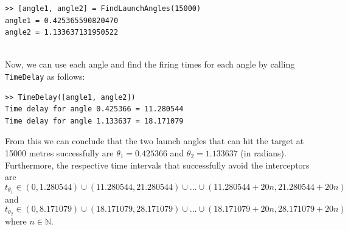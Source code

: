 \documentclass[11pt]{report}
\begin{document}
\begin{lstlisting}[title={Firing Angles (in radians) to hit target at 15000m.}]
>> [angle1, angle2] = FindLaunchAngles(15000)
angle1 = 0.425365590820470
angle2 = 1.133637131950522
\end{lstlisting}

\ \\
Now, we can use each angle and find the firing times for each angle by calling \texttt{TimeDelay} as follows:

\begin{lstlisting}[title={Time delays for both firing angles.}]
>> TimeDelay([angle1, angle2])
Time delay for angle 0.425366 = 11.280544
Time delay for angle 1.133637 = 18.171079
\end{lstlisting}

From this we can conclude that the two launch angles that can hit the target at 15000 metres successfully are $\theta_1 = 0.425366$ and $\theta_2 = 1.133637$ (in radians). Furthermore, the respective time intervals that successfully avoid the interceptors are
 $$ t_{\theta_1} \in (0, 1.280544) \cup (11.280544, 21.280544) \cup \ldots \cup (11.280544 + 20n, 21.280544 + 20n)$$ 
 and
 $$ t_{\theta_2} \in (0, 8.171079) \cup (18.171079, 28.171079) \cup \ldots \cup (18.171079 + 20n, 28.171079 + 20n)$$
 where $n \in \mathbb{N}$.
\end{document}
